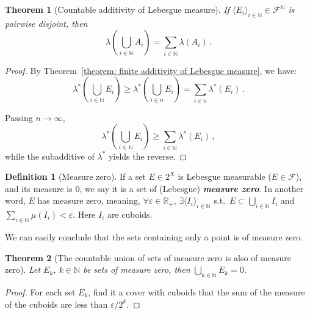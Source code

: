 \documentclass[openany]{book}
\newcommand*{\indexbf}[1]{\emph{\textbf{#1}}\index{#1}} %
\theoremstyle{plain}
\newtheorem{theorem}{Theorem}[section] %
\theoremstyle{definition}
\newtheorem{definition}{Definition}[section] %
\begin{document}
\begin{theorem}[Countable additivity of Lebesgue measure]
	\label{theorem: countable additivity of Lebesgue measure}
	If $\langle E_i\rangle_{i \in \mathbb N} \in \mathscr F^\mathbb N$ is pairwise disjoint, then
	\begin{equation*}
		\lambda \left( 
				\bigcup_{i \in \mathbb N} A_i 
			 \right) = \sum_{i \in \mathbb N} \lambda(A_i)\,.
	\end{equation*}
\end{theorem}
\begin{proof}
	By Theorem~\ref{theorem: finite additivity of Lebesgue measure}, we have:
	\begin{equation*}
		\lambda^*\left( \bigcup_{i \in \mathbb N} E_i \right) 
			\geq \lambda^*\left( \bigcup_{i \in n} E_i \right)
			= \sum_{i \in n} \lambda^*(E_i)\,.
	\end{equation*}

	Passing $n \to \infty$, 
	\begin{equation*}
		\lambda^*\left( \bigcup_{i \in \mathbb N} E_i \right) 
			\geq  \sum_{i \in \mathbb N} \lambda^*(E_i)\,,
	\end{equation*}
	while the subadditive of $\lambda^*$ yields the reverse.
\end{proof}

\begin{definition}[Measure zero]
	If a set $E \in 2^X$ is Lebesgue measurable ($E \in \mathscr F$), and its measure is $0$, we say it is a set of (Lebesgue) \indexbf{measure zero}. 
	In another word, $E$ has measure zero, meaning, $\forall \varepsilon \in \mathbb R_+$, $\exists \langle I_i\rangle_{i \in \mathbb N}$ s.t.\ $E \subset \bigcup_{i \in \mathbb N} I_i$ and $\sum_{i \in \mathbb N} \mu(I_i) < \varepsilon$. 
	Here $I_i$ are cuboids.
\end{definition}

We can easily conclude that the sets containing only a point is of measure zero.

\begin{theorem}[The countable union of sets of measure zero is also of measure zero]
	\label{theorem: the countable union of sets of measure zero is also of measure zero}
	Let $E_k$, $k \in \mathbb N$ be sets of measure zero, then $\bigcup_{k \in \mathbb N} E_k = 0$.
\end{theorem}
\begin{proof}
	For each set $E_k$, find it a cover with cuboids that the sum of the measure of the cuboids are less than $\varepsilon / 2^k$.
\end{proof}
\end{document}
